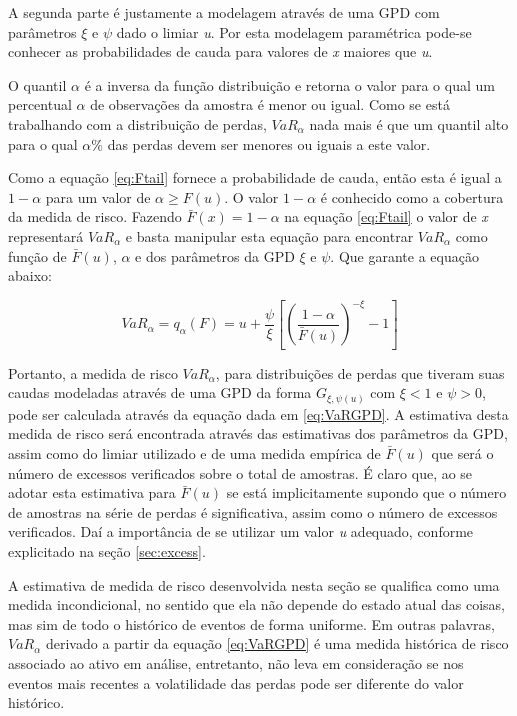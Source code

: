 \documentclass[review]{elsarticle}
\theoremstyle{definition}
\begin{document}
A segunda parte é justamente a modelagem através de uma GPD com parâmetros $\xi$ e $\psi$ dado o limiar \emph{u}. Por esta modelagem paramétrica pode-se conhecer as probabilidades de cauda para valores de \emph{x} maiores que \emph{u}.

O quantil $\alpha$ é a inversa da função distribuição e retorna o valor para o qual um percentual $\alpha$ de observações da amostra é menor ou igual. Como se está trabalhando com a distribuição de perdas, $VaR_\alpha$ nada mais é que um quantil alto para o qual $\alpha \%$ das perdas devem ser menores ou iguais a este valor.

Como a equação \eqref{eq:Ftail} fornece a probabilidade de cauda, então esta é igual a $1- \alpha$ para um valor de $\alpha  \geq F(u)$. O valor $1- \alpha$ é conhecido como a cobertura da medida de risco. Fazendo $\bar{F}(x)=1-\alpha$ na equação \eqref{eq:Ftail} o valor de \emph{x} representará $VaR_\alpha$ e basta manipular esta equação para encontrar $VaR_\alpha$ como função de $\bar{F}(u)$, $\alpha$ e dos parâmetros da GPD $\xi$ e $\psi$. Que garante a equação abaixo:

\begin{equation}
\label{eq:VaRGPD}
VaR_\alpha = q_\alpha(F) = u+\frac{\psi}{\xi}\left[ \left( \frac{1-\alpha}{\bar{F}(u)}\right)^{-\xi}-1 \right]
\end{equation}

Portanto, a medida de risco $VaR_\alpha$, para distribuições de perdas que tiveram suas caudas modeladas através de uma GPD da forma $G_{\xi, \psi(u)}$ com $\xi <1 \text{ e } \psi > 0$, pode ser calculada através da equação dada em \eqref{eq:VaRGPD}. A estimativa desta medida de risco será encontrada através das estimativas dos parâmetros da GPD, assim como do limiar utilizado e de uma medida empírica de $\bar{F}(u)$ que será o número de excessos verificados sobre o total de amostras. É claro que, ao se adotar esta estimativa para $\bar{F}(u)$ se está implicitamente supondo que o número de amostras na série de perdas é significativa, assim como o número de excessos verificados. Daí a importância de se utilizar um valor \emph{u} adequado, conforme explicitado na seção \ref{sec:excess}.

A estimativa de medida de risco desenvolvida nesta seção se qualifica como uma medida incondicional, no sentido que ela não depende do estado atual das coisas, mas sim de todo o histórico de eventos de forma uniforme. Em outras palavras, $VaR_\alpha$ derivado a partir da equação \eqref{eq:VaRGPD} é uma medida histórica de risco associado ao ativo em análise, entretanto, não leva em consideração se nos eventos mais recentes a volatilidade das perdas pode ser diferente do valor histórico.
\end{document}

